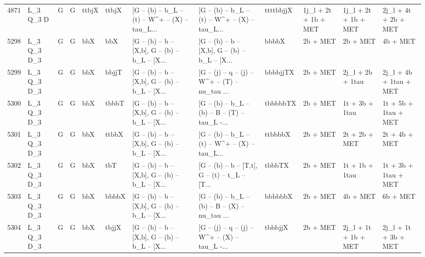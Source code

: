 \begin{tabular}{llllllllllll}
4871 &    L\_3 Q\_3 D &     G &     G &       ttbjX &       ttbjX &  [G -- (b) -- b\_L -- (t) -- W\textasciicircum + -- (X) -- tau\_L... &  [G -- (b) -- b\_L -- (t) -- W\textasciicircum + -- (X) -- tau\_L... &   ttttbbjjX &     1j\_l + 2t + 1b + MET &     1j\_l + 2t + 1b + MET &               2j\_l + 4t + 2b + MET \\
5298 &  L\_3 Q\_3 D\_3 &     G &     G &         bbX &         bbX &  [G -- (b) -- b -- [X,b], G -- (b) -- b\_L -- [X... &  [G -- (b) -- b -- [X,b], G -- (b) -- b\_L -- [X... &       bbbbX &                 2b + MET &                 2b + MET &                           4b + MET \\
5299 &  L\_3 Q\_3 D\_3 &     G &     G &         bbX &       bbjjT &  [G -- (b) -- b -- [X,b], G -- (b) -- b\_L -- [X... &  [G -- (j) -- q -- (j) -- W\textasciicircum + -- (T) -- nu\_tau ... &    bbbbjjTX &                 2b + MET &         2j\_l + 2b + 1tau &             2j\_l + 4b + 1tau + MET \\
5300 &  L\_3 Q\_3 D\_3 &     G &     G &         bbX &       tbbbT &  [G -- (b) -- b -- [X,b], G -- (b) -- b\_L -- [X... &  [G -- (b) -- b\_L -- (b) -- B -- (T) -- tau\_L -... &    tbbbbbTX &                 2b + MET &           1t + 3b + 1tau &               1t + 5b + 1tau + MET \\
5301 &  L\_3 Q\_3 D\_3 &     G &     G &         bbX &       ttbbX &  [G -- (b) -- b -- [X,b], G -- (b) -- b\_L -- [X... &  [G -- (b) -- b\_L -- (t) -- W\textasciicircum + -- (X) -- tau\_L... &     ttbbbbX &                 2b + MET &            2t + 2b + MET &                      2t + 4b + MET \\
5302 &  L\_3 Q\_3 D\_3 &     G &     G &         bbX &         tbT &  [G -- (b) -- b -- [X,b], G -- (b) -- b\_L -- [X... &  [G -- (b) -- b -- [T,t], G -- (t) -- t\_L -- [T... &      tbbbTX &                 2b + MET &           1t + 1b + 1tau &               1t + 3b + 1tau + MET \\
5303 &  L\_3 Q\_3 D\_3 &     G &     G &         bbX &       bbbbX &  [G -- (b) -- b -- [X,b], G -- (b) -- b\_L -- [X... &  [G -- (b) -- b\_L -- (b) -- B -- (X) -- nu\_tau ... &     bbbbbbX &                 2b + MET &                 4b + MET &                           6b + MET \\
5304 &  L\_3 Q\_3 D\_3 &     G &     G &         bbX &       tbjjX &  [G -- (b) -- b -- [X,b], G -- (b) -- b\_L -- [X... &  [G -- (j) -- q -- (j) -- W\textasciicircum + -- (X) -- tau\_L -... &     tbbbjjX &                 2b + MET &     2j\_l + 1t + 1b + MET &               2j\_l + 1t + 3b + MET \\

\end{tabular}
